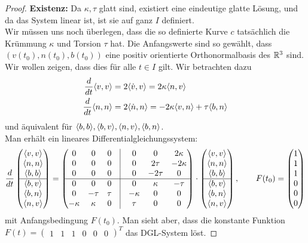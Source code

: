 \documentclass[11pt]{scrbook}
\begin{document}
\begin{st}
\begin{proof}
\textbf{Existenz:}
Da $\kappa, \tau$ glatt sind, existiert eine eindeutige glatte Lösung, und da das System linear ist, ist sie auf ganz $I$ definiert. \\
Wir müssen uns noch überlegen, dass die so definierte Kurve $c$ tatsächlich die Krümmung $\kappa$ und Torsion $\tau$ hat.
Die Anfangswerte sind so gewählt, dass $\left( v(t_0), n(t_0), b(t_0) \right)$ eine positiv orientierte Orthonormalbasis des $\mathbb{R}^3$ sind. Wir wollen zeigen, dass dies für alle $t \in I$ gilt. Wir betrachten dazu 
\begin{align*}
\frac{d}{dt} \langle v,v \rangle &= 2 \langle \dot v, v \rangle = 2 \kappa \langle n, v \rangle  \\
\frac{d}{dt} \langle n, n \rangle &= 2 \langle \dot n, n \rangle = -2 \kappa \langle v, n \rangle + \tau \langle b,n \rangle \\
\end{align*}
und äquivalent für $ \langle b,b \rangle, \langle b,v \rangle, \langle n,v \rangle, \langle b, n \rangle$. \\
Man erhält ein lineares Differentialgleichungssystem:
\[ 
 \f{d}{dt} \begin{pmatrix} \<v,v \> \\ \< n, n \> \\ \< b,b \> \\ \hline  \< b,v \> \\ \< b, n \> \\ \< n,v \>   \end{pmatrix} = \begin{pmatrix}  0 & 0 & 0 & \vline &  0 & 0 & 2 \kappa \\
0 & 0 & 0 & \vline & 0 & 2 \tau & -2 \kappa \\
0 & 0 & 0 & \vline & 0 & -2 \tau & 0 \\
\hline
0 & 0 & 0 & \vline & 0 & \kappa & - \tau  \\
0 &  - \tau & \tau & \vline & - \kappa & 0 & 0 \\
- \kappa & \kappa & 0 & \vline & \tau & 0 & 0  \end{pmatrix}  \cdot  \begin{pmatrix} \<v,v \> \\ \< n, n \> \\ \< b,b \> \\ \hline  \< b,v \> \\ \< b, n \> \\ \< n,v \>   \end{pmatrix}, \qquad F(t_0) = \begin{pmatrix} 1 \\ 1 \\ 1  \\ 0   \\ 0 \\ 0 \end{pmatrix}
\]
mit Anfangsbedingung $F(t_0)$. Man sieht aber, dass die konstante Funktion $F(t) = \begin{pmatrix} 1 & 1 & 1 & 0 & 0 & 0 \end{pmatrix}^T$ das DGL-System löst.


\end{proof}
\end{st}
\end{document}
